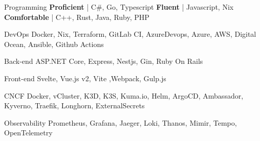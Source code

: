 

\begin{cvskills}

    \cvskill
    {Programming} %
    {\textbf{Proficient} | C\#, Go, Typescript  \hspace{3pt} \textbf{Fluent} | Javascript, Nix \hspace{3pt} \textbf{Comfortable} | C++, Rust, Java, Ruby, PHP }

    \cvskill
    {DevOps} %
    {Docker, Nix, Terraform, GitLab CI, AzureDevops, Azure, AWS, Digital Ocean, Ansible, Github Actions} %

    \cvskill
    {Back-end}
    {ASP.NET Core, Express, Nestjs, Gin, Ruby On Rails}

    \cvskill
    {Front-end}
    {Svelte, Vue.js v2, Vite ,Webpack, Gulp.js}

    \cvskill
    {CNCF}
    {Docker, vCluster, K3D, K3S, Kuma.io, Helm, ArgoCD, Ambassador, Kyverno, Traefik, Longhorn, ExternalSecrets}

    \cvskill
    {Observability}
    {Prometheus, Grafana, Jaeger, Loki, Thanos, Mimir, Tempo, OpenTelemetry}

\end{cvskills}
